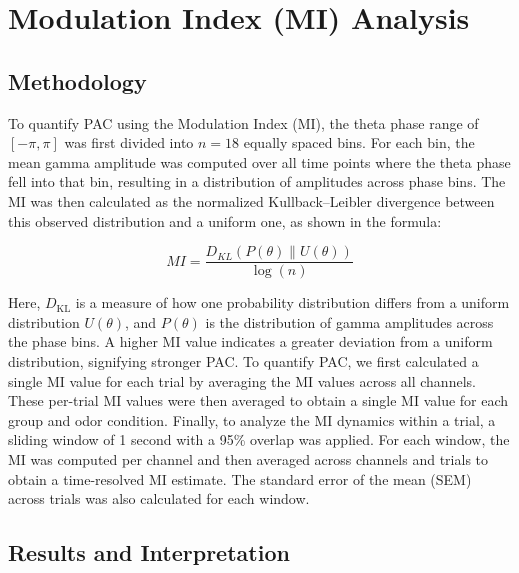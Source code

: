 \documentclass[hidelinks,12pt]{article}
\begin{document}
	\newpage
	
	\section{Modulation Index (MI) Analysis}
	
	\subsection{Methodology}
	
	To quantify PAC using the Modulation Index (MI), the theta phase range of $[-\pi, \pi]$ was first divided into $n = 18$ equally spaced bins. For each bin, the mean gamma amplitude was computed over all time points where the theta phase fell into that bin, resulting in a distribution of amplitudes across phase bins.  
	\bigbreak
	The MI was then calculated as the normalized Kullback--Leibler divergence between this observed distribution and a uniform one, as shown in the formula:
	
	
	\[
	MI = \frac{D_{KL}(P(\theta) \parallel U(\theta))}{\log(n)}
	\]
	
	Here, $D_{\mathrm{KL}}$ is a measure of how one probability distribution differs from a uniform distribution $U(\theta)$, and $P(\theta)$ is the distribution of gamma amplitudes across the phase bins. A higher MI value indicates a greater deviation from a uniform distribution, signifying stronger PAC.  
	\bigbreak
	To quantify PAC, we first calculated a single MI value for each trial by averaging the MI values across all channels. These per-trial MI values were then averaged to obtain a single MI value for each group and odor condition. Finally, to analyze the MI dynamics within a trial, a sliding window of 1 second with a 95\% overlap was applied. For each window, the MI was computed per channel and then averaged across channels and trials to obtain a time-resolved MI estimate. The standard error of the mean (SEM) across trials was also calculated for each window.
	
	
	\subsection{Results and Interpretation}
	
\end{document}
